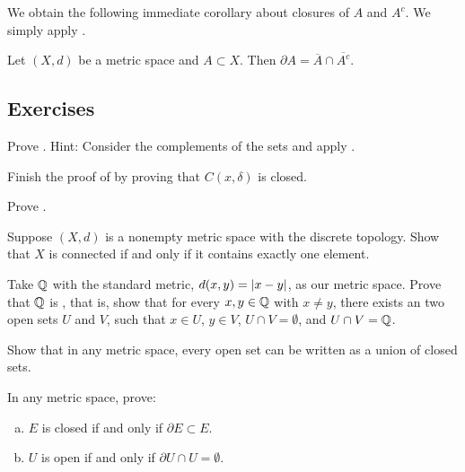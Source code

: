 We obtain the following immediate corollary about closures of $A$ and $A^c$.  We
simply apply .

\begin{cor}
Let $(X,d)$ be a metric space and $A \subset X$.
Then $\partial A = \overline{A} \cap \overline{A^c}$.
\end{cor}

\subsection{Exercises}

\begin{exercise}
Prove .  Hint: Consider the complements of the
sets and apply .
\end{exercise}

\begin{exercise}
Finish the proof of  by
proving that $C(x,\delta)$ is closed.
\end{exercise}

\begin{exercise}
Prove .
\end{exercise}

\begin{exercise}
Suppose $(X,d)$ is a nonempty metric space with the discrete topology.  Show
that $X$ is connected if and only if it contains exactly one element.
\end{exercise}

\begin{exercise}
Take ${\mathbb{Q}}$ with the standard metric, $d(x,y) = \left\lvert {x-y} \right\rvert$, as our metric space.
Prove that ${\mathbb{Q}}$ is
\emph{}, that is, show 
that for every $x, y \in {\mathbb{Q}}$ with $x \not= y$, there exists an
two open sets $U$ and $V$, such that $x \in U$, $y \in V$,
$U \cap V = \emptyset$, and $U \cap V = {\mathbb{Q}}$.
\end{exercise}

\begin{exercise}
Show that in any metric space,
every open set can be written as a union of closed sets.
\end{exercise}

\begin{samepage}
\begin{exercise}
In any metric space, prove:
\begin{enumerate}[a)]
\item
$E$ is closed if and only if $\partial E \subset E$.
\item
$U$ is open if and only if $\partial U \cap U = \emptyset$.
\end{enumerate}
\end{exercise}
\end{samepage}

